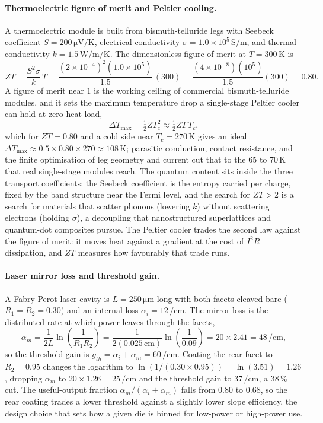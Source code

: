 \paragraph{Thermoelectric figure of merit and Peltier cooling.}
A thermoelectric module is built from bismuth-telluride legs with
Seebeck coefficient $S = 200\,\si{\micro\volt\per\kelvin}$, electrical
conductivity $\sigma = 1.0\times 10^{5}\,\si{\siemens\per\meter}$, and
thermal conductivity $k = 1.5\,\si{\watt\per\meter\per\kelvin}$. The
dimensionless figure of merit at $T = 300\,\si{\kelvin}$ is
\[
ZT = \frac{S^{2}\sigma}{k}\,T
= \frac{(2\times 10^{-4})^{2}(1.0\times 10^{5})}{1.5}\,(300)
= \frac{(4\times 10^{-8})(10^{5})}{1.5}(300)
= 0.80.
\]
A figure of merit near $1$ is the working ceiling of commercial
bismuth-telluride modules, and it sets the maximum temperature drop a
single-stage Peltier cooler can hold at zero heat load,
\[
\Delta T_{\max} = \tfrac{1}{2}Z T_{c}^{2}
\approx \tfrac{1}{2}ZT\,T_{c},
\]
which for $ZT = 0.80$ and a cold side near $T_{c} = 270\,\si{\kelvin}$
gives an ideal $\Delta T_{\max} \approx 0.5\times 0.80\times 270 \approx
108\,\si{\kelvin}$; parasitic conduction, contact resistance, and the
finite optimisation of leg geometry and current cut that to the $65$ to
$70\,\si{\kelvin}$ that real single-stage modules reach. The quantum content sits inside the three transport
coefficients: the Seebeck coefficient is the entropy carried per charge,
fixed by the band structure near the Fermi level, and the search for
$ZT > 2$ is a search for materials that scatter phonons (lowering $k$)
without scattering electrons (holding $\sigma$), a decoupling that
nanostructured superlattices and quantum-dot composites pursue. The
Peltier cooler trades the second law against the figure of merit: it
moves heat against a gradient at the cost of $I^{2}R$ dissipation, and
$ZT$ measures how favourably that trade runs.

\paragraph{Laser mirror loss and threshold gain.}
A Fabry-Perot laser cavity is $L = 250\,\si{\micro\meter}$ long with
both facets cleaved bare ($R_1 = R_2 = 0.30$) and an internal loss
$\alpha_i = 12\,\si{\per\centi\meter}$. The mirror loss is the
distributed rate at which power leaves through the facets,
\[
\alpha_m = \frac{1}{2L}\ln\!\left(\frac{1}{R_1 R_2}\right)
         = \frac{1}{2(0.025\,\si{\centi\meter})}\ln\!\left(
           \frac{1}{0.09}\right)
         = 20\times 2.41 = 48\,\si{\per\centi\meter},
\]
so the threshold gain is $g_{th} = \alpha_i + \alpha_m = 60\,\si{\per
\centi\meter}$. Coating the rear facet to $R_2 = 0.95$ changes the
logarithm to $\ln(1/(0.30\times 0.95)) = \ln(3.51) = 1.26$, dropping
$\alpha_m$ to $20\times 1.26 = 25\,\si{\per\centi\meter}$ and the
threshold gain to $37\,\si{\per\centi\meter}$, a $38\,\%$ cut. The
useful-output fraction $\alpha_m/(\alpha_i+\alpha_m)$ falls from $0.80$
to $0.68$, so the rear coating trades a lower threshold against a slightly
lower slope efficiency, the design choice that sets how a given die is
binned for low-power or high-power use.

